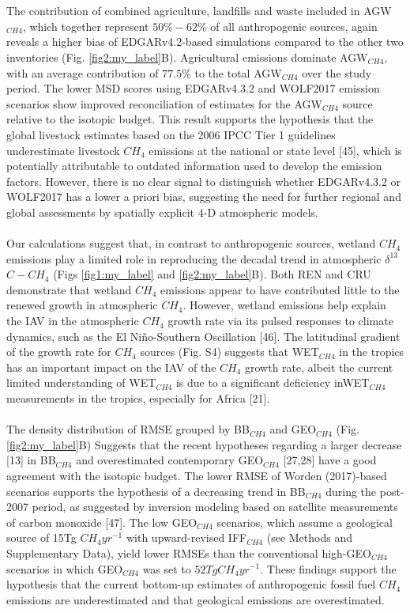 \documentclass[a4paper,12pt]{article}
\begin{document}
\\\\
\small{The contribution of combined agriculture, landfills and waste included in AGW$_{CH4}$, which together represent $50\%-62\%$ of all anthropogenic sources, again reveals a higher bias of EDGARv4.2-based simulations compared to the other two inventories (Fig. \ref{fig2:my_label}B). Agricultural emissions dominate AGW$_{CH4}$, with an average contribution of $77.5\%$ to the total AGW$_{CH4}$ over the study period. The lower MSD scores using EDGARv4.3.2 and WOLF2017 emission scenarios show improved reconciliation of estimates for the AGW$_{CH4}$ source relative to the isotopic budget. This result supports the hypothesis that the global livestock estimates based on the 2006 IPCC Tier 1 guidelines underestimate livestock $CH_{4}$ emissions at the national or state level [45], which is potentially attributable to outdated information used to develop the emission factors. However, there is no clear signal to distinguish whether EDGARv4.3.2 or WOLF2017 has a lower a priori bias, suggesting the need for further regional and global assessments by spatially explicit 4-D atmospheric models.}
\\\\
\small{Our calculations suggest that, in contrast to anthropogenic sources, wetland $CH_{4}$ emissions play a limited role in reproducing the decadal trend in atmospheric $\delta^{13}$$C-CH_{4}$ (Figs \ref{fig1:my_label} and \ref{fig2:my_label}B). Both REN and CRU demonstrate that wetland $CH_{4}$ emissions appear to have contributed little to the renewed growth in atmospheric $CH_{4}$. However, wetland emissions help explain the IAV in the atmospheric $CH_{4}$ growth rate via its pulsed responses to climate dynamics, such as the El Niño-Southern Oscillation [46]. The latitudinal gradient of the growth rate for $CH_{4}$ sources (Fig. S4) suggests that WET$_{CH4}$ in the tropics has an important impact on the IAV of the $CH_{4}$ growth rate, albeit the current limited understanding of WET$_{CH4}$ is due to a significant deficiency inWET$_{CH4}$ measurements in the tropics, especially for Africa [21].}
\\\\
\small{The density distribution of RMSE grouped by BB$_{CH4}$ and GEO$_{CH4}$ (Fig. \ref{fig2:my_label}B) Suggests that the recent hypotheses regarding a larger decrease [13] in BB$_{CH4}$ and overestimated contemporary GEO$_{CH4}$ [27,28] have a good agreement with the isotopic budget. The lower RMSE of Worden (2017)-based scenarios supports the hypothesis of a decreasing trend in BB$_{CH4}$ during the post-2007 period, as suggested by inversion modeling based on satellite measurements of carbon monoxide [47]. The low GEO$_{CH4}$ scenarios, which assume a geological source of 15Tg $CH_{4}yr^{-1}$ with upward-revised IFF$_{CH4}$ (see Methods and Supplementary Data), yield lower RMSEs than the conventional high-GEO$_{CH4}$ scenarios in which GEO$_{CH4}$ was set to $52TgCH_{4}yr^{-1}$. These findings support the hypothesis that the current bottom-up estimates of anthropogenic fossil fuel $CH_{4}$ emissions are underestimated and that geological emissions are overestimated.}
\end{document}
